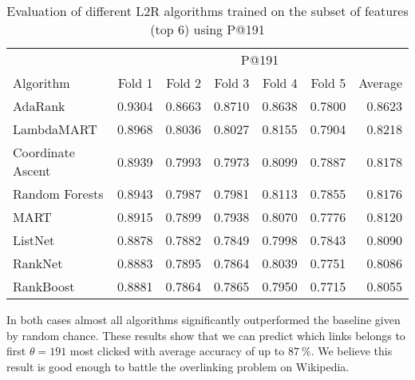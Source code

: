 \begin{table*}[p]
\caption{Evaluation of different L2R algorithms trained on the subset of features (top 6) using P@191 }
\centering
\label{tab:eval_p@191_feature}
\begin{tabular}{lrrrrrr}
\toprule
& \multicolumn{6}{c}{P@191} \\
\cmidrule{2-7}
Algorithm & Fold 1 & Fold 2 & Fold 3 & Fold 4 & Fold 5 & Average \\
\midrule
AdaRank & 0.9304 & 0.8663 & 0.8710 & 0.8638 & 0.7800 & 0.8623 \\
LambdaMART & 0.8968 & 0.8036 & 0.8027 & 0.8155 & 0.7904 & 0.8218 \\
Coordinate Ascent & 0.8939 & 0.7993 & 0.7973 & 0.8099 & 0.7887 & 0.8178 \\
Random Forests & 0.8943 & 0.7987 & 0.7981 & 0.8113 & 0.7855 & 0.8176 \\
MART & 0.8915 & 0.7899 & 0.7938 & 0.8070 & 0.7776 & 0.8120 \\
ListNet & 0.8878 & 0.7882 & 0.7849 & 0.7998 & 0.7843 & 0.8090 \\
RankNet & 0.8883 & 0.7895 & 0.7864 & 0.8039 & 0.7751 & 0.8086 \\
RankBoost & 0.8881 & 0.7864 & 0.7865 & 0.7950 & 0.7715 & 0.8055 \\
\bottomrule
\end{tabular}
\end{table*}

In both cases almost all algorithms significantly outperformed the baseline given by random chance. These results show that we can predict which links belongs to first $\theta = 191$ most clicked with average accuracy of up to $87~\%$. We believe this result is good enough to battle the overlinking problem on Wikipedia.